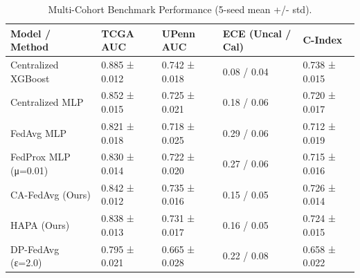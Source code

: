 \begin{table}
\caption{Multi-Cohort Benchmark Performance (5-seed mean +/- std).}
\label{tab:table1}
\begin{tabular}{lllll}
\toprule
Model / Method & TCGA AUC & UPenn AUC & ECE (Uncal / Cal) & C-Index \\
\midrule
Centralized XGBoost & 0.885 ± 0.012 & 0.742 ± 0.018 & 0.08 / 0.04 & 0.738 ± 0.015 \\
Centralized MLP & 0.852 ± 0.015 & 0.725 ± 0.021 & 0.18 / 0.06 & 0.720 ± 0.017 \\
FedAvg MLP & 0.821 ± 0.018 & 0.718 ± 0.025 & 0.29 / 0.06 & 0.712 ± 0.019 \\
FedProx MLP (μ=0.01) & 0.830 ± 0.014 & 0.722 ± 0.020 & 0.27 / 0.06 & 0.715 ± 0.016 \\
CA-FedAvg (Ours) & 0.842 ± 0.012 & 0.735 ± 0.016 & 0.15 / 0.05 & 0.726 ± 0.014 \\
HAPA (Ours) & 0.838 ± 0.013 & 0.731 ± 0.017 & 0.16 / 0.05 & 0.724 ± 0.015 \\
DP-FedAvg (ε=2.0) & 0.795 ± 0.021 & 0.665 ± 0.028 & 0.22 / 0.08 & 0.658 ± 0.022 \\
\bottomrule
\end{tabular}
\end{table}
